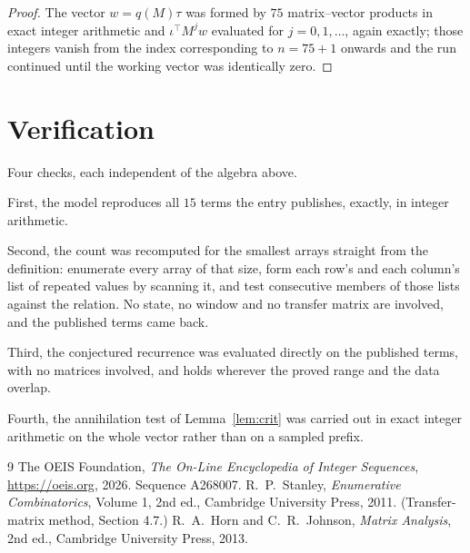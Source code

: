 \documentclass[11pt,a4paper]{article}
\theoremstyle{plain}
\theoremstyle{definition}
\begin{document}
\begin{proof}
The vector $w=q(M)\tau$ was formed by $75$ matrix--vector products in exact integer
arithmetic and $\iota^{\!\top}M^{j}w$ evaluated for $j=0,1,\dots$, again exactly; those
integers vanish from the index corresponding to $n=75+1$ onwards and the run continued
until the working vector was identically zero.
\end{proof}

\section{Verification}

Four checks, each independent of the algebra above.

First, the model reproduces all $15$ terms the entry publishes, exactly, in integer
arithmetic.

Second, the count was recomputed for the smallest arrays straight from the definition:
enumerate every array of that size, form each row's and each column's list of repeated values
by scanning it, and test consecutive members of those lists against the relation. No state, no
window and no transfer matrix are involved, and the published terms came back.

Third, the conjectured recurrence was evaluated directly on the published terms, with no
matrices involved, and holds wherever the proved range and the data overlap.

Fourth, the annihilation test of Lemma~\ref{lem:crit} was carried out in exact integer
arithmetic on the whole vector rather than on a sampled prefix.

\begin{thebibliography}{9}
 The OEIS Foundation, \emph{The On-Line Encyclopedia of Integer
Sequences}, \url{https://oeis.org}, 2026. Sequence A268007.
 R.~P.~Stanley, \emph{Enumerative Combinatorics}, Volume 1, 2nd ed.,
Cambridge University Press, 2011. (Transfer-matrix method, Section 4.7.)
 R.~A.~Horn and C.~R.~Johnson, \emph{Matrix Analysis}, 2nd ed., Cambridge
University Press, 2013.
\end{thebibliography}
\end{document}
